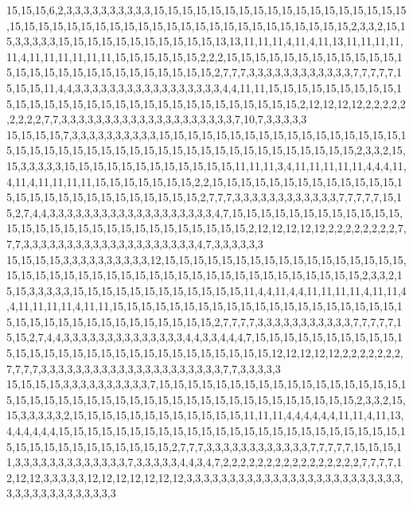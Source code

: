 15,15,15,6,2,3,3,3,3,3,3,3,3,3,3,15,15,15,15,15,15,15,15,15,15,15,15,15,15,15,15,15,15,15,15,15,15,15,15,15,15,15,15,15,15,15,15,15,15,15,15,15,15,15,15,15,15,2,3,3,2,15,15,3,3,3,3,3,15,15,15,15,15,15,15,15,15,15,15,13,13,11,11,11,4,11,4,11,13,11,11,11,11,11,4,11,11,11,11,11,11,15,15,15,15,15,15,2,2,2,15,15,15,15,15,15,15,15,15,15,15,15,15,15,15,15,15,15,15,15,15,15,15,15,15,15,15,2,7,7,7,3,3,3,3,3,3,3,3,3,3,3,3,7,7,7,7,7,15,15,15,11,4,4,3,3,3,3,3,3,3,3,3,3,3,3,3,3,3,3,3,4,4,11,11,15,15,15,15,15,15,15,15,15,15,15,15,15,15,15,15,15,15,15,15,15,15,15,15,15,15,15,15,15,15,2,12,12,12,12,2,2,2,2,2,2,2,2,2,7,7,3,3,3,3,3,3,3,3,3,3,3,3,3,3,3,3,3,3,3,3,7,10,7,3,3,3,3,3
15,15,15,15,7,3,3,3,3,3,3,3,3,3,3,15,15,15,15,15,15,15,15,15,15,15,15,15,15,15,15,15,15,15,15,15,15,15,15,15,15,15,15,15,15,15,15,15,15,15,15,15,15,15,15,15,15,2,3,3,2,15,15,3,3,3,3,3,15,15,15,15,15,15,15,15,15,15,15,15,11,11,11,3,4,11,11,11,11,11,4,4,4,11,4,11,4,11,11,11,11,15,15,15,15,15,15,15,2,2,15,15,15,15,15,15,15,15,15,15,15,15,15,15,15,15,15,15,15,15,15,15,15,15,15,15,15,2,7,7,7,3,3,3,3,3,3,3,3,3,3,3,3,7,7,7,7,7,15,15,2,7,4,4,3,3,3,3,3,3,3,3,3,3,3,3,3,3,3,3,3,3,3,4,7,15,15,15,15,15,15,15,15,15,15,15,15,15,15,15,15,15,15,15,15,15,15,15,15,15,15,15,15,15,2,12,12,12,12,12,2,2,2,2,2,2,2,2,7,7,7,3,3,3,3,3,3,3,3,3,3,3,3,3,3,3,3,3,3,3,3,4,7,3,3,3,3,3,3
15,15,15,15,3,3,3,3,3,3,3,3,3,3,12,15,15,15,15,15,15,15,15,15,15,15,15,15,15,15,15,15,15,15,15,15,15,15,15,15,15,15,15,15,15,15,15,15,15,15,15,15,15,15,15,15,15,2,3,3,2,15,15,3,3,3,3,3,15,15,15,15,15,15,15,15,15,15,15,15,11,4,4,11,4,4,11,11,11,11,4,11,11,4,4,11,11,11,11,4,11,11,15,15,15,15,15,15,15,15,15,15,15,15,15,15,15,15,15,15,15,15,15,15,15,15,15,15,15,15,15,15,15,15,15,15,15,2,7,7,7,7,3,3,3,3,3,3,3,3,3,3,3,7,7,7,7,7,15,15,2,7,4,4,3,3,3,3,3,3,3,3,3,3,3,3,3,3,4,4,3,3,4,4,4,7,15,15,15,15,15,15,15,15,15,15,15,15,15,15,15,15,15,15,15,15,15,15,15,15,15,15,15,15,15,12,12,12,12,12,2,2,2,2,2,2,2,7,7,7,7,3,3,3,3,3,3,3,3,3,3,3,3,3,3,3,3,3,3,3,3,3,7,7,3,3,3,3,3
15,15,15,15,3,3,3,3,3,3,3,3,3,3,7,15,15,15,15,15,15,15,15,15,15,15,15,15,15,15,15,15,15,15,15,15,15,15,15,15,15,15,15,15,15,15,15,15,15,15,15,15,15,15,15,15,15,2,3,3,2,15,15,3,3,3,3,3,2,15,15,15,15,15,15,15,15,15,15,15,15,11,11,11,4,4,4,4,4,4,11,11,4,11,13,4,4,4,4,4,4,15,15,15,15,15,15,15,15,15,15,15,15,15,15,15,15,15,15,15,15,15,15,15,15,15,15,15,15,15,15,15,15,15,15,15,15,2,7,7,7,3,3,3,3,3,3,3,3,3,3,3,3,7,7,7,7,7,15,15,15,11,3,3,3,3,3,3,3,3,3,3,3,3,3,7,3,3,3,3,3,4,4,3,4,7,2,2,2,2,2,2,2,2,2,2,2,2,2,2,2,2,7,7,7,7,12,12,12,3,3,3,3,3,12,12,12,12,12,12,12,3,3,3,3,3,3,3,3,3,3,3,3,3,3,3,3,3,3,3,3,3,3,3,3,3,3,3,3,3,3,3,3,3,3,3,3,3,3
